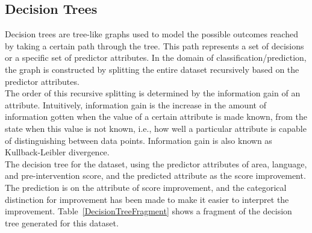 \documentclass[10pt]{article}
\begin{document}
\subsection{Decision Trees}
Decision trees are tree-like graphs used to model the possible outcomes reached by taking a certain path through the tree. This path represents a set of decisions or a specific set of predictor attributes. In the domain of classification/prediction, the graph is constructed by splitting the entire dataset recursively based on the predictor attributes.\\
The order of this recursive splitting is determined by the information gain of an attribute. Intuitively, information gain is the increase in the amount of information gotten when the value of a certain attribute is made known, from the state when this value is not known, i.e., how well a particular attribute is capable of distinguishing between data points. Information gain is also known as Kullback-Leibler divergence.\\
The decision tree for the dataset, using the predictor attributes of area, language, and pre-intervention score, and the predicted attribute as the score improvement.\\
The prediction is on the attribute of score improvement, and the categorical distinction for improvement has been made to make it easier to interpret the improvement. Table~\ref{DecisionTreeFragment} shows a fragment of the decision tree generated for this dataset.
\end{document}
